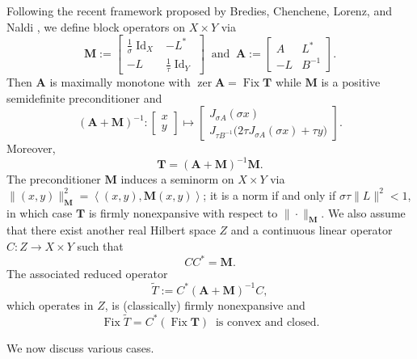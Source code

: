 \documentclass{article}
\newcommand{\bM}{\ensuremath{{\mathbf{M}}}}
\newcommand{\scal}[2]{\left\langle{#1},{#2}  \right\rangle}
\newcommand{\Tt}{\ensuremath{\widetilde{T}}}
\newcommand{\zer}{\ensuremath{\operatorname{zer}}}
\newcommand{\Fix}{\ensuremath{\operatorname{Fix}}}
\newcommand{\Id}{\ensuremath{\operatorname{Id}}}
\newcommand{\bT}{\ensuremath{{\mathbf{T}}}}
\newcommand{\bA}{\ensuremath{{\mathbf{A}}}}
\begin{document}
Following the recent framework proposed by 
Bredies, Chenchene, Lorenz, and Naldi \cite{BCLN}, 
we define block operators on $X\times Y$ via 
\begin{equation}
\bM := \begin{bmatrix}
\tfrac{1}{\sigma}\Id_X & -L^*\\
-L & \tfrac{1}{\tau}\Id_Y
\end{bmatrix} 
\;\;\text{and}\;\;
\bA := 
\begin{bmatrix}
A & L^* \\
-L & B^{-1}
\end{bmatrix}. 
\end{equation}
Then $\bA$ is maximally monotone with 
$\zer \bA = \Fix \bT$ while $\bM$ is a positive semidefinite preconditioner 
and 
\begin{equation}
\label{e:inv(A+M)}
(\bA +\bM)^{-1}
\colon \begin{bmatrix} x\\y\end{bmatrix}
\mapsto 
\begin{bmatrix}
J_{\sigma A}(\sigma x)\\
J_{\tau B^{-1}}\big(2\tau J_{\sigma A}(\sigma x)+\tau y  \big) 
\end{bmatrix}. 
\end{equation}
Moreover, 
\begin{equation}
\bT = (\bA +\bM)^{-1}\bM.
\end{equation}
The preconditioner $\bM$ induces a seminorm on $X\times Y$ via
$\|(x,y)\|_{\bM}^2 = \scal{(x,y)}{\bM(x,y)}$; it is a norm if and only 
if $\sigma\tau\|L\|^2<1$, in which case $\bT$ is firmly nonexpansive 
with respect to $\|\cdot\|_{\bM}$. 
We also assume that there exist another real Hilbert space $Z$ and 
a continuous linear operator $C\colon Z\to X\times Y$ such that 
\begin{equation}
CC^* = \bM.
\end{equation}
The associated reduced operator 
\begin{equation}
\label{e:Tt}
\Tt := C^*(\bA+\bM)^{-1}C, 
\end{equation}
which operates in $Z$, is (classically) firmly nonexpansive 
and 
\begin{equation}
\label{e:Fixx1}
\Fix \Tt = C^*(\Fix \bT) \;\;\text{is convex and closed.}
\end{equation}

We now discuss various cases. 
\end{document}
